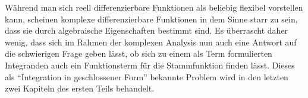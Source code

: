 Während man sich reell differenzierbare Funktionen als beliebig flexibel
vorstellen kann, scheinen komplexe differenzierbare Funktionen in dem
Sinne starr zu sein, dass sie durch algebraische Eigenschaften bestimmt
sind.
Es überrascht daher wenig, dass sich im Rahmen der komplexen Analysis 
nun auch eine Antwort auf die schwierigen Frage geben lässt, ob sich zu
einem als Term formulierten Integranden auch ein Funktionsterm für die
Stammfunktion finden lässt.
Dieses als ``Integration in geschlossener Form'' bekannte Problem wird
in den letzten zwei Kapiteln des ersten Teils behandelt.






